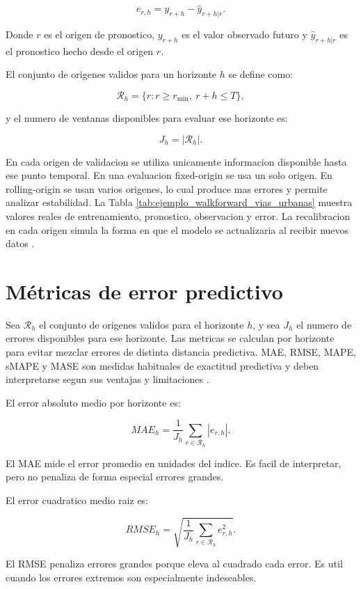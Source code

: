 ﻿\documentclass[12pt,letterpaper]{article}
\newcommand{\yhat}{\hat{y}}
\newcommand{\RMS}{RMSE}
\newcommand{\MAE}{MAE}
\begin{document}
\[
e_{r,h}=y_{r+h}-\yhat_{r+h|r}.
\]

Donde \(r\) es el origen de pronostico, \(y_{r+h}\) es el valor observado futuro y \(\yhat_{r+h|r}\) es el pronostico hecho desde el origen \(r\).

El conjunto de origenes validos para un horizonte \(h\) se define como:

\[
\mathcal{R}_h=\{r: r\geq r_{\min},\ r+h\leq T\},
\]

y el numero de ventanas disponibles para evaluar ese horizonte es:

\[
J_h=|\mathcal{R}_h|.
\]

En cada origen de validacion se utiliza unicamente informacion disponible hasta ese punto temporal. En una evaluacion fixed-origin se usa un solo origen. En rolling-origin se usan varios origenes, lo cual produce mas errores y permite analizar estabilidad. La Tabla \ref{tab:ejemplo_walkforward_vias_urbanas} muestra valores reales de entrenamiento, pronostico, observacion y error. La recalibracion en cada origen simula la forma en que el modelo se actualizaria al recibir nuevos datos \citep{tashman2000,hyndman2021fpp3}.



\section{Métricas de error predictivo}

Sea \(\mathcal{R}_h\) el conjunto de origenes validos para el horizonte \(h\), y sea \(J_h\) el numero de errores disponibles para ese horizonte. Las metricas se calculan por horizonte para evitar mezclar errores de distinta distancia predictiva. MAE, RMSE, MAPE, sMAPE y MASE son medidas habituales de exactitud predictiva y deben interpretarse segun sus ventajas y limitaciones \citep{hyndman_koehler2006,hyndman2021fpp3}.

El error absoluto medio por horizonte es:

\[
MAE_h =
\frac{1}{J_h}
\sum_{r\in\mathcal{R}_h}|e_{r,h}|.
\]

El \MAE{} mide el error promedio en unidades del indice. Es facil de interpretar, pero no penaliza de forma especial errores grandes.

El error cuadratico medio raiz es:

\[
RMSE_h =
\sqrt{
\frac{1}{J_h}
\sum_{r\in\mathcal{R}_h}e_{r,h}^2
}.
\]

El \RMS{} penaliza errores grandes porque eleva al cuadrado cada error. Es util cuando los errores extremos son especialmente indeseables.
\end{document}
